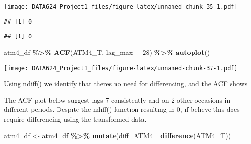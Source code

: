 \documentclass[
]{article}
\newenvironment{Shaded}{\begin{snugshade}}{\end{snugshade}}
\newcommand{\AttributeTok}[1]{\textcolor[rgb]{0.13,0.29,0.53}{#1}}
\newcommand{\DecValTok}[1]{\textcolor[rgb]{0.00,0.00,0.81}{#1}}
\newcommand{\FunctionTok}[1]{\textcolor[rgb]{0.13,0.29,0.53}{\textbf{#1}}}
\newcommand{\NormalTok}[1]{#1}
\newcommand{\OtherTok}[1]{\textcolor[rgb]{0.56,0.35,0.01}{#1}}
\newcommand{\SpecialCharTok}[1]{\textcolor[rgb]{0.81,0.36,0.00}{\textbf{#1}}}
\begin{document}
\texttt{[image: DATA624\_Project1\_files/figure-latex/unnamed-chunk-35-1.pdf]}

\begin{Shaded}
\end{Shaded}

\begin{verbatim}
## [1] 0
\end{verbatim}

\begin{Shaded}
\end{Shaded}

\begin{verbatim}
## [1] 0
\end{verbatim}

\begin{Shaded}
\begin{Highlighting}[]
\NormalTok{atm4\_df }\SpecialCharTok{\%\textgreater{}\%} 
  \FunctionTok{ACF}\NormalTok{(ATM4\_T, }\AttributeTok{lag\_max =} \DecValTok{28}\NormalTok{) }\SpecialCharTok{\%\textgreater{}\%} 
  \FunctionTok{autoplot}\NormalTok{()}
\end{Highlighting}
\end{Shaded}

\texttt{[image: DATA624\_Project1\_files/figure-latex/unnamed-chunk-37-1.pdf]}

Using ndiff() we identify that theres no need for differencing, and the
ACF shows

The ACF plot below suggest lags 7 consistently and on 2 other occasions
in different periods. Despite the ndiff() function resulting in 0, if
believe this does require differencing using the transformed data.

\begin{Shaded}
\begin{Highlighting}[]
\NormalTok{atm4\_df }\OtherTok{\textless{}{-}}\NormalTok{ atm4\_df }\SpecialCharTok{\%\textgreater{}\%} 
  \FunctionTok{mutate}\NormalTok{(}\AttributeTok{diff\_ATM4=} \FunctionTok{difference}\NormalTok{(ATM4\_T))}
\end{Highlighting}
\end{Shaded}
\end{document}
